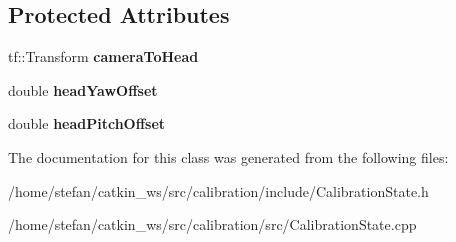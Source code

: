 \subsection*{\-Protected \-Attributes}
\begin{DoxyCompactItemize}
\item 
\hypertarget{classCalibrationState_ab392422f78f1886a9c04d5c0a4bc6464}{tf\-::\-Transform {\bfseries camera\-To\-Head}}\label{classCalibrationState_ab392422f78f1886a9c04d5c0a4bc6464}

\item 
\hypertarget{classCalibrationState_a59e5973fd377639de9bf5f854e3ee575}{double {\bfseries head\-Yaw\-Offset}}\label{classCalibrationState_a59e5973fd377639de9bf5f854e3ee575}

\item 
\hypertarget{classCalibrationState_adabafa1ab274107017ce2daadeb45b44}{double {\bfseries head\-Pitch\-Offset}}\label{classCalibrationState_adabafa1ab274107017ce2daadeb45b44}

\end{DoxyCompactItemize}


\-The documentation for this class was generated from the following files\-:\begin{DoxyCompactItemize}
\item 
/home/stefan/catkin\-\_\-ws/src/calibration/include/\-Calibration\-State.\-h\item 
/home/stefan/catkin\-\_\-ws/src/calibration/src/\-Calibration\-State.\-cpp\end{DoxyCompactItemize}
